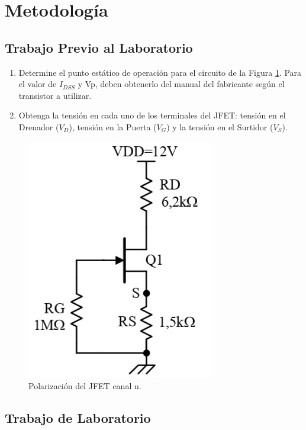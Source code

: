 \documentclass[12pt, a4paper]{article}
\begin{document}
    \newpage

    \section{Metodología}

    \subsection{Trabajo Previo al Laboratorio}

    \begin{enumerate}
        \item \label{p11}	Determine el punto estático de operación para el circuito de la Figura \ref{fig:cir1}. Para el valor de $I_{DSS}$ y Vp, deben obtenerlo del manual del fabricante según el transistor a utilizar.
        \item \label{p12}	Obtenga la tensión en cada uno de los terminales del JFET: tensión en el Drenador ($V_D$), tensión en la Puerta ($V_G$) y la tensión en el Surtidor ($V_S$).
    \end{enumerate}

    \begin{figure}[h!]
        \centering
        \includegraphics[height=5cm\textwidth]{circuito1.jpg}
        \caption{Polarización del JFET canal n.}
        \label{fig:cir1}
    \end{figure}

    \subsection{Trabajo de Laboratorio}
\end{document}
